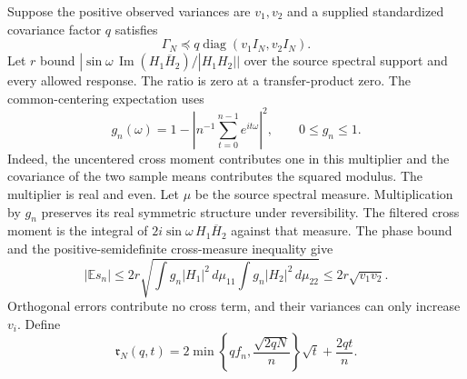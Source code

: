 Suppose the positive observed variances are $v_1,v_2$ and a supplied standardized covariance factor $q$ satisfies
\begin{equation}
 \Gamma_N\preceq q\operatorname{diag}(v_1I_N,v_2I_N).
 \label{cc16:standardized-envelope}
\end{equation}
Let $r$ bound $|\sin\omega\,\operatorname{Im}(H_1\overline H_2)/|H_1H_2||$ over the source spectral support and every allowed response. The ratio is zero at a transfer-product zero. The common-centering expectation uses
\[
 g_n(\omega)=1-\left|n^{-1}\sum_{t=0}^{n-1}e^{it\omega}\right|^2,
 \qquad 0\le g_n\le1.
\]
Indeed, the uncentered cross moment contributes one in this multiplier and the covariance of the two sample means contributes the squared modulus. The multiplier is real and even. Let $\mu$ be the source spectral measure. Multiplication by $g_n$ preserves its real symmetric structure under reversibility. The filtered cross moment is the integral of $2i\sin\omega\,H_1\overline H_2$ against that measure. The phase bound and the positive-semidefinite cross-measure inequality give
\begin{equation}
 |\mathbb E s_n|\le2r
 \sqrt{\int g_n|H_1|^2\,d\mu_{11}
       \int g_n|H_2|^2\,d\mu_{22}}
 \le2r\sqrt{v_1v_2}.
 \label{cc16:centered-tolerance}
\end{equation}
Orthogonal errors contribute no cross term, and their variances can only increase $v_i$. Define
\begin{equation}
 \mathfrak r_N(q,t)=
 2\min\left\{qf_n,\frac{\sqrt{2qN}}n\right\}\sqrt t
 +\frac{2qt}{n}.
 \label{cc16:standardized-radius}
\end{equation}

